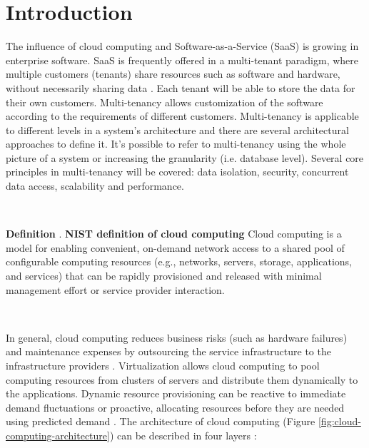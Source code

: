 \documentclass[11pt,english]{article} %
\newcounter{definitioncounter}
\newcommand*{\definition}[2]{\textbf{Definition \thedefinitioncounter\refstepcounter{definitioncounter}}.
\textbf{#1} #2}
\begin{document}
\maketitle
\tableofcontents %
\setlength\parindent{0pt} %

\newpage

\section{Introduction}
The influence of cloud computing and Software-as-a-Service (SaaS) is growing in enterprise software.
SaaS is frequently offered in a multi-tenant paradigm, where multiple customers (tenants) share resources such as software and hardware, without necessarily sharing data \cite{defining-multi-tenancy}.
Each tenant will be able to store the data for their own customers.
Multi-tenancy allows customization of the software according to the requirements of different customers.
Multi-tenancy is applicable to different levels in a system’s architecture and there are several architectural approaches to define it.
It's possible to refer to multi-tenancy using the whole picture of a system or increasing the granularity (i.e. database level).
Several core principles in multi-tenancy will be covered: data isolation, security, concurrent data access, scalability and performance.

\

\definition{NIST definition of cloud computing}{Cloud computing is a model for enabling convenient, on-demand network access to a shared pool of configurable computing resources (e.g., networks, servers, storage, applications, and services) that can be rapidly provisioned and released with minimal management effort or service provider interaction. \cite{cloud-computing-state-of-the-art}}

\

In general, cloud computing reduces business risks (such as hardware failures) and maintenance expenses by outsourcing the service infrastructure to the infrastructure providers \cite{cloud-computing-state-of-the-art}.
Virtualization allows cloud computing to pool computing resources from clusters of servers and distribute them dynamically to the applications.
Dynamic resource provisioning can be reactive to immediate demand fluctuations or proactive, allocating resources before they are needed using predicted demand \cite{cloud-computing-state-of-the-art}.
The architecture of cloud computing (Figure \ref{fig:cloud-computing-architecture}) can be described in four layers \cite{cloud-computing-state-of-the-art}:
\end{document}
